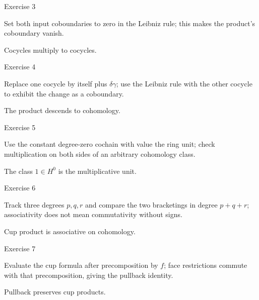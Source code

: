 \begin{exercise}\label{exr:viii29-03}
Exercise 3
\end{exercise}
\begin{hint}
Set both input coboundaries to zero in the Leibniz rule; this makes the product's coboundary vanish.
\end{hint}
\begin{solution}
Cocycles multiply to cocycles.
\end{solution}

\begin{exercise}\label{exr:viii29-04}
Exercise 4
\end{exercise}
\begin{hint}
Replace one cocycle by itself plus \(\delta\gamma\); use the Leibniz rule with the other cocycle to exhibit the change as a coboundary.
\end{hint}
\begin{solution}
The product descends to cohomology.
\end{solution}

\begin{exercise}\label{exr:viii29-05}
Exercise 5
\end{exercise}
\begin{hint}
Use the constant degree-zero cochain with value the ring unit; check multiplication on both sides of an arbitrary cohomology class.
\end{hint}
\begin{solution}
The class \(1\in H^0\) is the multiplicative unit.
\end{solution}

\begin{exercise}\label{exr:viii29-06}
Exercise 6
\end{exercise}
\begin{hint}
Track three degrees \(p,q,r\) and compare the two bracketings in degree \(p+q+r\); associativity does not mean commutativity without signs.
\end{hint}
\begin{solution}
Cup product is associative on cohomology.
\end{solution}

\begin{exercise}\label{exr:viii29-07}
Exercise 7
\end{exercise}
\begin{hint}
Evaluate the cup formula after precomposition by \(f\); face restrictions commute with that precomposition, giving the pullback identity.
\end{hint}
\begin{solution}
Pullback preserves cup products.
\end{solution}

